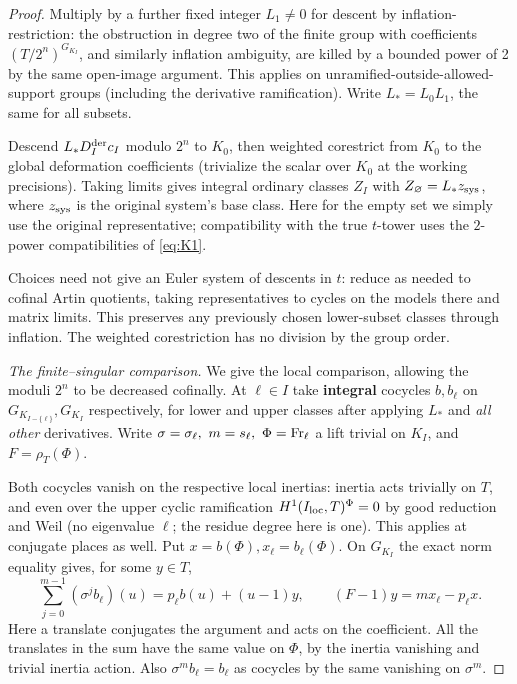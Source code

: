 \begin{proof}
Multiply by a further fixed integer \(L_1\ne0\) for descent by inflation-restriction: the obstruction in degree two of the finite group with coefficients \((T/2^n)^{G_{K_I}}\), and similarly inflation ambiguity, are killed by a bounded power of 2 by the same open-image argument. This applies on unramified-outside-allowed-support groups (including the derivative ramification). Write \(L_*=L_0L_1\), the same for all subsets. 

Descend \(L_*D_I^{\rm der}c_I\) modulo \(2^n\) to \(K_0\), then weighted corestrict from \(K_0\) to the global deformation coefficients (trivialize the scalar over \(K_0\) at the working precisions). Taking limits gives integral ordinary classes \(Z_I\) with \(Z_\varnothing=L_* z_{\rm sys}\), where \(z_{\rm sys}\) is the original system's base class. Here for the empty set we simply use the original representative; compatibility with the true \(t\)-tower uses the \(2\)-power compatibilities of \eqref{eq:K1}. 

Choices need not give an Euler system of descents in \(t\): reduce as needed to cofinal Artin quotients, taking representatives to cycles on the models there and matrix limits. This preserves any previously chosen lower-subset classes through inflation. The weighted corestriction has no division by the group order.

\emph{The finite--singular comparison.}
We give the local comparison, allowing the moduli \(2^n\) to be decreased cofinally. At \(\ell\in I\) take \textbf{integral} cocycles \(b,b_\ell\) on \(G_{K_{I-\{\ell\}}},G_{K_I}\) respectively, for lower and upper classes after applying \(L_*\) and \emph{all other} derivatives. Write \(\sigma=\sigma_\ell,\ m=s_\ell,\ \Phi={\rm Fr}_\ell\) a lift trivial on \(K_I\), and \(F=\rho_T(\Phi)\). 

Both cocycles vanish on the respective local inertias: inertia acts trivially on \(T\), and even over the upper cyclic ramification \(H^1(I_{\rm loc},T)^\Phi=0\) by good reduction and Weil (no eigenvalue \(\ell\); the residue degree here is one). This applies at conjugate places as well. Put \(x=b(\Phi), x_\ell=b_\ell(\Phi)\). On \(G_{K_I}\) the exact norm equality gives, for some \(y\in T\),
\[
 \sum_{j=0}^{m-1}(\sigma^j b_\ell)(u)=p_\ell b(u)+(u-1)y,\qquad
 (F-1)y=m x_\ell-p_\ell x.
\]
Here a translate conjugates the argument and acts on the coefficient. All the translates in the sum have the same value on \(\Phi\), by the inertia vanishing and trivial inertia action. Also \(\sigma^m b_\ell=b_\ell\) as cocycles by the same vanishing on \(\sigma^m\).


\end{proof}
